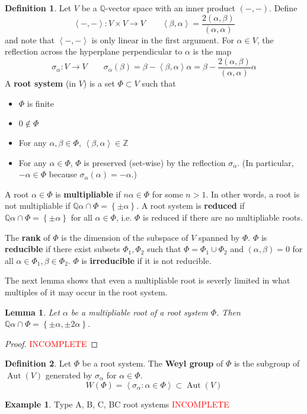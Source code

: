 \documentclass[12pt]{article}
\newtheorem{lemma}{Lemma}
\theoremstyle{definition}
\newtheorem{definition}{Definition}
\newtheorem{example}{Example}
\newcommand{\Z}{\mathbb{Z}}
\newcommand{\Q}{\mathbb{Q}}
\newcommand{\sig}{\sigma}
\newcommand{\lb}{\left\{}
\newcommand{\rb}{\right\}}
\newcommand{\la}{\left\langle}
\newcommand{\ra}{\right\rangle}
\newcommand{\tbf}{\textbf}
\newcommand{\noi}{\noindent}
\newcommand{\incomplete}{\textcolor{red}{INCOMPLETE}}
\DeclareMathOperator{\Aut}{Aut}
\begin{document}
\begin{definition}
Let $V$ be a $\Q$-vector space with an inner product $(-,-)$. Define
\[
	\la -, - \ra: V \times V \to V \qquad \la \beta, \alpha \ra = \frac{2(\alpha,\beta)}{(\alpha,\alpha)}
\]
and note that $\la -, - \ra$ is only linear in the first argument. For $\alpha \in V$, the reflection across the hyperplane perpendicular to $\alpha$ is the map
\[
	\sig_\alpha:V \to V \qquad \sig_\alpha(\beta) = \beta - \la \beta, \alpha \ra \alpha =  \beta - \displaystyle \frac{2(\alpha,\beta)}{(\alpha,\alpha)} \alpha
\]
A \tbf{root system} (in $V$) is a set $\Phi \subset V$ such that
\begin{itemize}
	\item $\Phi$ is finite
	\item $0 \not \in \Phi$
	\item For any $\alpha, \beta \in \Phi$, $\la \beta, \alpha \ra \in \Z$
	\item For any $\alpha \in \Phi$, $\Phi$ is preserved (set-wise) by the reflection $\sig_\alpha$. (In particular, $-\alpha \in \Phi$ because $\sig_\alpha(\alpha) = - \alpha$.)
\end{itemize}
A root $\alpha \in \Phi$ is \tbf{multipliable} if $n \alpha \in \Phi$ for some $n > 1$. In other words, a root is not multipliable if $\Q \alpha \cap \Phi = \lb \pm \alpha \rb$. A root system is \tbf{reduced} if $\Q \alpha \cap \Phi = \lb \pm \alpha \rb$ for all $\alpha \in \Phi$, i.e. $\Phi$ is reduced if there are no multipliable roots.

The \tbf{rank} of $\Phi$ is the dimension of the subspace of $V$ spanned by $\Phi$. $\Phi$ is \tbf{reducible} if there exist subsets $\Phi_1, \Phi_2$ such that $\Phi = \Phi_1 \cup \Phi_2$ and $(\alpha, \beta) = 0$ for all $\alpha \in \Phi_1, \beta \in \Phi_2$. $\Phi$ is \tbf{irreducible} if it is not reducible.
\end{definition}

\noi The next lemma shows that even a multipliable root is severly limited in what multiples of it may occur in the root system.

\begin{lemma}
Let $\alpha$ be a multipliable root of a root system $\Phi$. Then $\Q \alpha \cap \Phi = \lb \pm \alpha, \pm 2 \alpha \rb$. 
\end{lemma}
\begin{proof}
\incomplete
\end{proof}

\begin{definition}
Let $\Phi$ be a root system. The \tbf{Weyl group} of $\Phi$ is the subgroup of $\Aut(V)$ generated by $\sig_\alpha$ for $\alpha \in \Phi$.
\[
	W(\Phi) = \la \sig_\alpha : \alpha \in \Phi \ra \subset \Aut(V)
\]
\end{definition}

\begin{example}
Type A, B, C, BC root systems \incomplete
\end{example}
\end{document}
